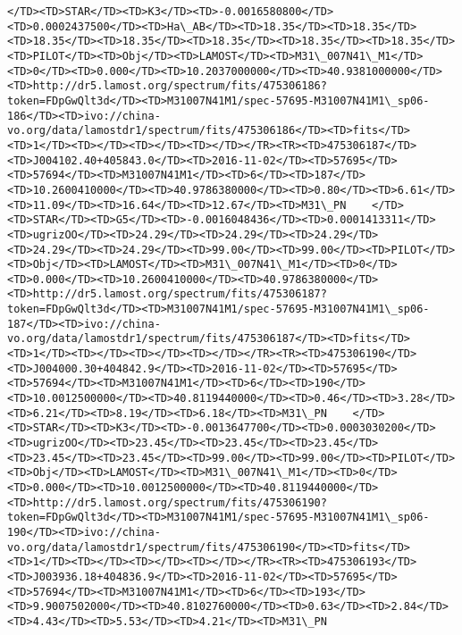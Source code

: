 \documentclass[11pt]{article}
\begin{document}
\begin{Verbatim}[commandchars=\\\{\}]
</TD><TD>STAR</TD><TD>K3</TD><TD>-0.0016580800</TD><TD>0.0002437500</TD><TD>Ha\_AB</TD><TD>18.35</TD><TD>18.35</TD><TD>18.35</TD><TD>18.35</TD><TD>18.35</TD><TD>18.35</TD><TD>18.35</TD><TD>PILOT</TD><TD>Obj</TD><TD>LAMOST</TD><TD>M31\_007N41\_M1</TD><TD>0</TD><TD>0.000</TD><TD>10.2037000000</TD><TD>40.9381000000</TD><TD>http://dr5.lamost.org/spectrum/fits/475306186?token=FDpGwQlt3d</TD><TD>M31007N41M1/spec-57695-M31007N41M1\_sp06-186</TD><TD>ivo://china-vo.org/data/lamostdr1/spectrum/fits/475306186</TD><TD>fits</TD><TD>1</TD><TD></TD><TD></TD><TD></TD></TR><TR><TD>475306187</TD><TD>J004102.40+405843.0</TD><TD>2016-11-02</TD><TD>57695</TD><TD>57694</TD><TD>M31007N41M1</TD><TD>6</TD><TD>187</TD><TD>10.2600410000</TD><TD>40.9786380000</TD><TD>0.80</TD><TD>6.61</TD><TD>11.09</TD><TD>16.64</TD><TD>12.67</TD><TD>M31\_PN    </TD><TD>STAR</TD><TD>G5</TD><TD>-0.0016048436</TD><TD>0.0001413311</TD><TD>ugrizOO</TD><TD>24.29</TD><TD>24.29</TD><TD>24.29</TD><TD>24.29</TD><TD>24.29</TD><TD>99.00</TD><TD>99.00</TD><TD>PILOT</TD><TD>Obj</TD><TD>LAMOST</TD><TD>M31\_007N41\_M1</TD><TD>0</TD><TD>0.000</TD><TD>10.2600410000</TD><TD>40.9786380000</TD><TD>http://dr5.lamost.org/spectrum/fits/475306187?token=FDpGwQlt3d</TD><TD>M31007N41M1/spec-57695-M31007N41M1\_sp06-187</TD><TD>ivo://china-vo.org/data/lamostdr1/spectrum/fits/475306187</TD><TD>fits</TD><TD>1</TD><TD></TD><TD></TD><TD></TD></TR><TR><TD>475306190</TD><TD>J004000.30+404842.9</TD><TD>2016-11-02</TD><TD>57695</TD><TD>57694</TD><TD>M31007N41M1</TD><TD>6</TD><TD>190</TD><TD>10.0012500000</TD><TD>40.8119440000</TD><TD>0.46</TD><TD>3.28</TD><TD>6.21</TD><TD>8.19</TD><TD>6.18</TD><TD>M31\_PN    </TD><TD>STAR</TD><TD>K3</TD><TD>-0.0013647700</TD><TD>0.0003030200</TD><TD>ugrizOO</TD><TD>23.45</TD><TD>23.45</TD><TD>23.45</TD><TD>23.45</TD><TD>23.45</TD><TD>99.00</TD><TD>99.00</TD><TD>PILOT</TD><TD>Obj</TD><TD>LAMOST</TD><TD>M31\_007N41\_M1</TD><TD>0</TD><TD>0.000</TD><TD>10.0012500000</TD><TD>40.8119440000</TD><TD>http://dr5.lamost.org/spectrum/fits/475306190?token=FDpGwQlt3d</TD><TD>M31007N41M1/spec-57695-M31007N41M1\_sp06-190</TD><TD>ivo://china-vo.org/data/lamostdr1/spectrum/fits/475306190</TD><TD>fits</TD><TD>1</TD><TD></TD><TD></TD><TD></TD></TR><TR><TD>475306193</TD><TD>J003936.18+404836.9</TD><TD>2016-11-02</TD><TD>57695</TD><TD>57694</TD><TD>M31007N41M1</TD><TD>6</TD><TD>193</TD><TD>9.9007502000</TD><TD>40.8102760000</TD><TD>0.63</TD><TD>2.84</TD><TD>4.43</TD><TD>5.53</TD><TD>4.21</TD><TD>M31\_PN    
\end{Verbatim}
\end{document}
